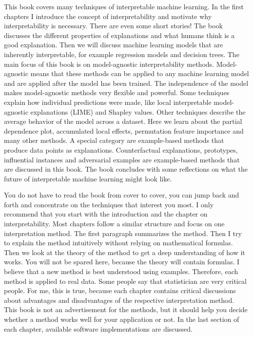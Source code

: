 \documentclass[
  12pt,
]{krantz}
\begin{document}
This book covers many techniques of interpretable machine learning.
In the first chapters I introduce the concept of interpretability and motivate why interpretability is necessary.
There are even some short stories!
The book discusses the different properties of explanations and what humans think is a good explanation.
Then we will discuss machine learning models that are inherently interpretable, for example regression models and decision trees.
The main focus of this book is on model-agnostic interpretability methods.
Model-agnostic means that these methods can be applied to any machine learning model and are applied after the model has been trained.
The independence of the model makes model-agnostic methods very flexible and powerful.
Some techniques explain how individual predictions were made, like local interpretable model-agnostic explanations (LIME) and Shapley values.
Other techniques describe the average behavior of the model across a dataset.
Here we learn about the partial dependence plot, accumulated local effects, permutation feature importance and many other methods.
A special category are example-based methods that produce data points as explanations.
Counterfactual explanations, prototypes, influential instances and adversarial examples are example-based methods that are discussed in this book.
The book concludes with some reflections on what the future of interpretable machine learning might look like.

You do not have to read the book from cover to cover, you can jump back and forth and concentrate on the techniques that interest you most.
I only recommend that you start with the introduction and the chapter on interpretability.
Most chapters follow a similar structure and focus on one interpretation method.
The first paragraph summarizes the method.
Then I try to explain the method intuitively without relying on mathematical formulas.
Then we look at the theory of the method to get a deep understanding of how it works.
You will not be spared here, because the theory will contain formulas.
I believe that a new method is best understood using examples.
Therefore, each method is applied to real data.
Some people say that statistician are very critical people.
For me, this is true, because each chapter contains critical discussions about advantages and disadvantages of the respective interpretation method.
This book is not an advertisement for the methods, but it should help you decide whether a method works well for your application or not.
In the last section of each chapter, available software implementations are discussed.
\end{document}

